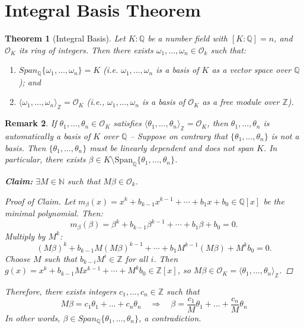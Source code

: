 \documentclass[11pt]{book}
\newtheorem{theorem}{Theorem}[section]
\newtheorem{remark}[theorem]{Remark}
\begin{document}
\section{Integral Basis Theorem}

\begin{theorem}[Integral Basis] \label{thm-intbasis}
Let $K:\mathbb{Q}$ be a number field with $[K:\mathbb{Q}] = n$, and $\mathcal{O}_K$ its ring of integers. Then there exists $\omega_1, \ldots, \omega_n \in \mathcal{O}_k$ such that:
\begin{enumerate}
    \item $Span_{\mathbb{Q}}\{\omega_1, \ldots, \omega_n\} = K$ (i.e. $\omega_1, \ldots, \omega_n$ is a basis of $K$ as a vector space over $\mathbb{Q}$); and
    \item $\langle \omega_1, \ldots, \omega_n \rangle_{\mathbb{Z}} = \mathcal{O}_K$ (i.e., $\omega_1, \ldots, \omega_n$ is a basis of $\mathcal{O}_K$ as a free module over $\mathbb{Z}$).
\end{enumerate}
\end{theorem}

\begin{remark}
If $\theta_1, \ldots, \theta_n \in \mathcal{O}_K$ satisfies $\langle \theta_1, \ldots, \theta_n \rangle_{\mathbb{Z}} = \mathcal{O}_K$, then $\theta_1, \ldots, \theta_n$ is automatically a basis of $K$ over $\mathbb{Q}$ -- Suppose on contrary that $\{\theta_1, \ldots, \theta_n\}$ is not a basis. Then $\{\theta_1, \ldots, \theta_n\}$ must be linearly dependent and does not span $K$. In particular, there exists $\beta \in K \setminus \mathrm{Span}_{\mathbb{Q}}\{\theta_1, \ldots, \theta_n\}$.

\medskip
\noindent \textbf{Claim:} $\exists M \in \mathbb{N}$ such that $M\beta \in \mathcal{O}_k$. 

\begin{proof}[Proof of Claim]
Let $m_\beta(x) = x^k + b_{k-1}x^{k-1} + \cdots + b_1x + b_0 \in \mathbb{Q}[x]$ be the minimal polynomial. Then:
$$
m_\beta(\beta) = \beta^k + b_{k-1}\beta^{k-1} + \cdots + b_1\beta + b_0 = 0.
$$
Multiply by $M^k$:
$$
(M\beta)^k + b_{k-1}M(M\beta)^{k-1} + \cdots + b_1M^{k-1}(M\beta) + M^k b_0 = 0.
$$
Choose $M$ such that $b_{k-i}M^i \in \mathbb{Z}$ for all $i$. Then $g(x) = x^k + b_{k-1}Mx^{k-1} + \cdots + M^k b_0 \in \mathbb{Z}[x]$, so $M\beta \in \mathcal{O}_K = \langle \theta_1, \ldots, \theta_n \rangle_{\mathbb{Z}}$.
\end{proof}
Therefore, there exists integers $c_1, \dots, c_n \in \mathbb{Z}$ such that 
$$M\beta = c_1\theta_1 + \dots + c_n\theta_n \quad \Rightarrow \quad \beta = \frac{c_1}{M}\theta_1 + \dots + \frac{c_n}{M}\theta_n$$
In other words, $\beta \in Span_{\mathbb{Q}}\{\theta_1,\dots,\theta_n\}$, a contradiction.
\end{remark}
\end{document}
